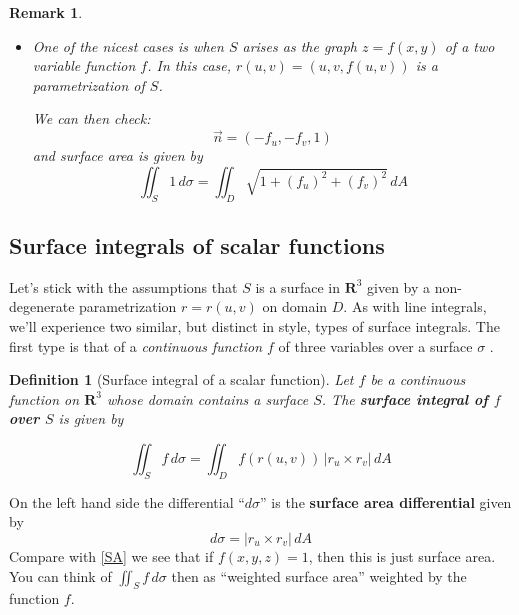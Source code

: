 \documentclass[12pt]{article}
\numberwithin{equation}{subsection}
\numberwithin{figure}{subsection}
\newtheorem{defn}[subsection]{Definition}
\theoremstyle{note}
\newtheorem{remark}[subsection]{Remark}
\begin{document}
{\begin{remark}
\begin{itemize}
	\item One of the nicest cases is when $S$ arises as the graph $z=f(x,y)$ of a two variable function $f$. In this case, $r(u,v)=(u,v,f(u,v))$ is a parametrization of $S$. 
	
	We can then check: \[ \vec{n} = (-f_u,-f_v,1) \] and surface area is given by  \begin{equation} \label{eq-SA} \iint_S 1\,d\sigma= \iint_D \sqrt{ 1+ (f_u)^2+(f_v)^2 }\,dA\end{equation}

\end{itemize}
\end{remark}




\subsection{Surface integrals of scalar functions} Let's stick with the assumptions that $S$ is a surface in $\mathbf{R}^3$ given by a non-degenerate parametrization $r=r(u,v)$ on domain $D$.  As with line integrals, we'll experience two similar, but distinct in style, types of surface integrals. The first type is that of a \textit{continuous function $f$} of three variables over a surface $\sigma$ . 

\begin{defn}[Surface integral of a scalar function]Let $f$ be a continuous function on $\mathbf{R}^3$ whose domain contains a surface $S$. The \textbf{surface integral of $f$ over $S$} is given by

\begin{equation} 
	\label{Surface-func}
	\iint_{S} f \,d\sigma= \iint_D f\left(r(u,v)\right) \, |r_u \times r_v| \,dA
\end{equation}
\end{defn}
On the left hand side the differential ``$d\sigma$'' is the \textbf{surface area differential} given by \begin{equation} d\sigma= |r_u \times r_v| \,dA\end{equation} Compare with \eqref{SA} we see that if $f(x,y,z)=1$, then this is just surface area. You can think of $\iint_{S} f\,d\sigma$ then as ``weighted surface area'' weighted by the function $f$. 

}
\end{document}
